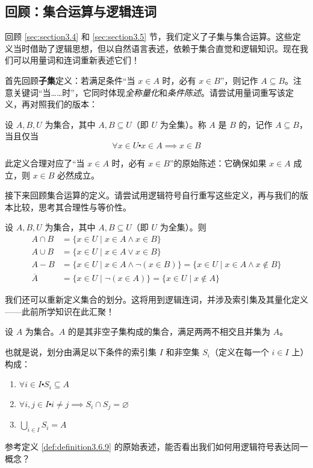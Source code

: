 \subsection{回顾：集合运算与逻辑连词}\label{sec:section4.5.4}

回顾 \ref{sec:section3.4} 和 \ref{sec:section3.5} 节，我们定义了子集与集合运算。这些定义当时借助了逻辑思想，但以自然语言表述，依赖于集合直觉和逻辑知识。现在我们可以用量词和连词重新表述它们！

首先回顾\textbf{子集}定义：若满足条件``当 $x \in A$ 时，必有 $x \in B$''，则记作 $A \subseteq B$。注意关键词``当……时''，它同时体现\emph{全称量化}和\emph{条件陈述}。请尝试用量词重写该定义，再对照我们的版本：

\begin{definition}
    设 $A, B, U$ 为集合，其中 $A, B \subseteq U$（即 $U$ 为全集）。称 $A$ 是 $B$ 的，记作 $A \subseteq B$，当且仅当
    \[\forall x \in U \centerdot x \in A \implies x \in B \]
\end{definition}

此定义合理对应了``当 $x \in A$ 时，必有 $x \in B$''的原始陈述：它确保如果 $x \in A$ 成立，则 $x \in B$ 必然成立。

接下来回顾集合运算的定义。请尝试用逻辑符号自行重写这些定义，再与我们的版本比较，思考其合理性与等价性。

\begin{definition}
    设 $A, B, U$ 为集合，其中 $A, B \subseteq U$（即 $U$ 为全集）。则
    \begin{align*}
        A \cap B &= \{x \in U \mid x \in A \land x \in B\} \\
        A \cup B &= \{x \in U \mid x \in A \lor x \in B\} \\
        A - B &= \{x \in U \mid x \in A \land \neg (x \in B)\} = \{x\in U \mid x \in A \land x \notin B\} \\
        \overline{A} &= \{x \in U \mid \neg (x \in A)\} = \{x \in U \mid x \notin A\}
    \end{align*}
\end{definition}

我们还可以重新定义集合的划分。这将用到逻辑连词，并涉及索引集及其量化定义——此前所学知识在此汇聚！

\begin{definition} \label{def:definition4.5.11}
    设 $A$ 为集合。$A$ 的是其非空子集构成的集合，满足两两不相交且并集为 $A$。

    也就是说，划分由满足以下条件的索引集 $I$ 和非空集 $S_i$（定义在每一个 $i \in I$ 上）构成：
    \begin{enumerate}[label=(\arabic*)]
        \item $\forall i \in I \centerdot S_i \subseteq A$
        \item $\forall i, j \in I \centerdot i \ne j \implies S_i \cap S_j = \varnothing$
        \item $\displaystyle{\bigcup_{i \in I} S_i = A}$
    \end{enumerate}
\end{definition}

参考定义 \ref{def:definition3.6.9} 的原始表述，能否看出我们如何用逻辑符号表达同一概念？
